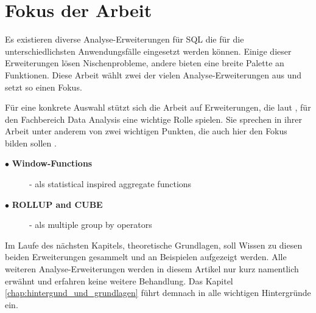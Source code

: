 \section{Fokus der Arbeit}
\label{sec:fokus_der_arbeit} Es existieren diverse Analyse-Erweiterungen für SQL
die für die unterschiedlichsten Anwendungsfälle eingesetzt werden können. Einige
dieser Erweiterungen lösen Nischenprobleme, andere bieten eine breite Palette an
Funktionen. Diese Arbeit wählt zwei der vielen Analyse-Erweiterungen aus und
setzt so einen Fokus.

Für eine konkrete Auswahl stützt sich die Arbeit auf Erweiterungen, die laut \citet[S.
245]{FOTACHE2015243}, für den Fachbereich Data Analysis eine wichtige Rolle spielen.
Sie sprechen in ihrer Arbeit unter anderem von zwei wichtigen Punkten, die auch hier
den Fokus bilden sollen \citep[vgl.][S. 245]{FOTACHE2015243}.

\begin{description}
	\item[$\bullet$ \textbf{Window-Functions}] - als statistical inspired aggregate
		functions \\ \citep[vgl.][S. 245]{FOTACHE2015243}

	\item[$\bullet$ \textbf{ROLLUP and CUBE}] - als multiple group by operators \\
		\citep[vgl.][S. 247 - 248]{FOTACHE2015243}
\end{description}

Im Laufe des nächsten Kapitels, theoretische Grundlagen, soll Wissen zu diesen beiden
Erweiterungen gesammelt und an Beispielen aufgezeigt werden. Alle weiteren
Analyse-Erweiterungen werden in diesem Artikel nur kurz namentlich erwähnt und
erfahren keine weitere Behandlung. Das Kapitel \ref{chap:hintergund_und_grundlagen}
führt demnach in alle wichtigen Hintergründe ein.